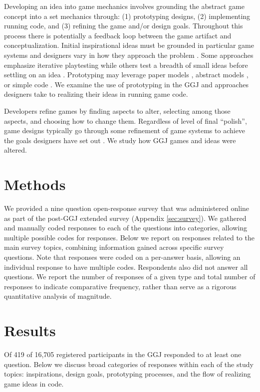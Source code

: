 \documentclass{sig-alternate}
\begin{document}
Developing an idea into game mechanics involves grounding the abstract game concept into a set mechanics through: (1) prototyping designs, (2) implementing running code, and (3) refining the game and/or design goals. Throughout this process there is potentially a feedback loop between the game artifact and conceptualization. Initial inspirational ideas must be grounded in particular game systems and designers vary in how they approach the problem \cite{gabler2005:7day-prototype,manker2011:prototyping,nelson2009:reqanal}. Some approaches emphasize iterative playtesting \cite{fullerton2008:playcentric,schell2008:gamedesign} while others test a breadth of small ideas before settling on an idea \cite{gabler2005:7day-prototype}. Prototyping may leverage paper models \cite{manker2011:prototyping}, abstract models \cite{dormans2011:machinations2,nelson2009:reqanal}, or simple code \cite{gabler2005:7day-prototype}. We examine the use of prototyping in the GGJ and approaches designers take to realizing their ideas in running game code.

Developers refine games by finding aspects to alter, selecting among those aspects, and choosing how to change them. Regardless of level of final ``polish'', game designs typically go through some refinement of game systems to achieve the goals designers have set out \cite{fullerton2008:playcentric,schell2008:gamedesign}. We study how GGJ games and ideas were altered.


\section{Methods}
We provided a nine question open-response survey that was administered online as part of the post-GGJ extended survey (Appendix \ref{sec:survey}). We gathered and manually coded responses to each of the questions into categories, allowing multiple possible codes for responses. Below we report on responses related to the main survey topics, combining information gained across specific survey questions. Note that responses were coded on a per-answer basis, allowing an individual response to have multiple codes. Respondents also did not answer all questions. We report the number of responses of a given type and total number of responses to indicate comparative frequency, rather than serve as a rigorous quantitative analysis of magnitude.


\section{Results}
Of 419 of 16,705 registered participants in the GGJ responded to at least one question.
Below we discuss broad categories of responses within each of the study topics: inspirations, design goals, prototyping processes, and the flow of realizing game ideas in code.
\end{document}
